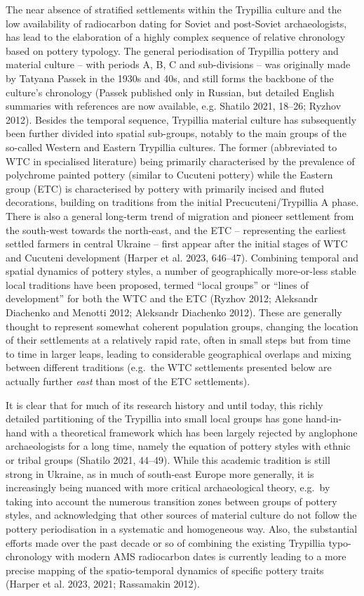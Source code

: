\documentclass[
  12pt,
  a4paper, twoside]{book}
\begin{document}
The near absence of stratified settlements within the Trypillia culture and the low availability of radiocarbon dating for Soviet and post-Soviet archaeologists, has lead to the elaboration of a highly complex sequence of relative chronology based on pottery typology. The general periodisation of Trypillia pottery and material culture -- with periods A, B, C and sub-divisions -- was originally made by Tatyana Passek in the 1930s and 40s, and still forms the backbone of the culture's chronology (Passek published only in Russian, but detailed English summaries with references are now available, e.g. Shatilo 2021, 18--26; Ryzhov 2012). Besides the temporal sequence, Trypillia material culture has subsequently been further divided into spatial sub-groups, notably to the main groups of the so-called Western and Eastern Trypillia cultures. The former (abbreviated to WTC in specialised literature) being primarily characterised by the prevalence of polychrome painted pottery (similar to Cucuteni pottery) while the Eastern group (ETC) is characterised by pottery with primarily incised and fluted decorations, building on traditions from the initial Precucuteni/Trypillia A phase. There is also a general long-term trend of migration and pioneer settlement from the south-west towards the north-east, and the ETC -- representing the earliest settled farmers in central Ukraine -- first appear after the initial stages of WTC and Cucuteni development (Harper et al. 2023, 646--47). Combining temporal and spatial dynamics of pottery styles, a number of geographically more-or-less stable local traditions have been proposed, termed ``local groups'' or ``lines of development'' for both the WTC and the ETC (Ryzhov 2012; Aleksandr Diachenko and Menotti 2012; Aleksandr Diachenko 2012). These are generally thought to represent somewhat coherent population groups, changing the location of their settlements at a relatively rapid rate, often in small steps but from time to time in larger leaps, leading to considerable geographical overlaps and mixing between different traditions (e.g.~the WTC settlements presented below are actually further \emph{east} than most of the ETC settlements).

It is clear that for much of its research history and until today, this richly detailed partitioning of the Trypillia into small local groups has gone hand-in-hand with a theoretical framework which has been largely rejected by anglophone archaeologists for a long time, namely the equation of pottery styles with ethnic or tribal groups (Shatilo 2021, 44--49). While this academic tradition is still strong in Ukraine, as in much of south-east Europe more generally, it is increasingly being nuanced with more critical archaeological theory, e.g.~by taking into account the numerous transition zones between groups of pottery styles, and acknowledging that other sources of material culture do not follow the pottery periodisation in a systematic and homogeneous way. Also, the substantial efforts made over the past decade or so of combining the existing Trypillia typo-chronology with modern AMS radiocarbon dates is currently leading to a more precise mapping of the spatio-temporal dynamics of specific pottery traits (Harper et al. 2023, 2021; Rassamakin 2012).
\end{document}
